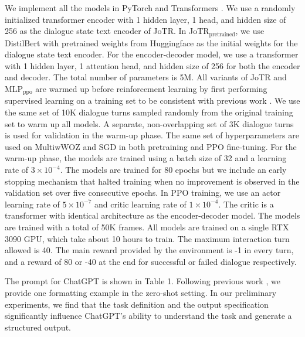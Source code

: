 \documentclass[letterpaper]{article} %
\begin{document}
We implement all the models in PyTorch \cite{paszke2019pytorch} and Transformers \cite{wolf-etal-2020-transformers}. 
We use a randomly initialized transformer encoder with 1 hidden layer, 1 head, and hidden size of 256 as the dialogue state text encoder of JoTR. 
In JoTR$_\text{pretrained}$, we use DistilBert \cite{sanh2019distilbert} with pretrained weights from Huggingface as the initial weights for the dialogue state text encoder.
For the encoder-decoder model, we use a transformer with 1 hidden layer, 1 attention head, and hidden size of 256 for both the encoder and decoder. The total number of parameters is 5M. All variants of JoTR and MLP$_\text{ppo}$ are warmed up before reinforcement learning by first performing supervised learning on a training set to be consistent with previous work \cite{wang-wong-2021-collaborative}. We use the same set of 10K dialogue turns sampled randomly from the original training set to warm up all models. A separate, non-overlapping set of 3K dialogue turns is used for validation in the warm-up phase.  The same set of hyperparameters are used on MultiwWOZ and SGD in both pretraining and PPO fine-tuning. For the warm-up phase, the models are trained using a batch size of 32 and a learning rate of $3 \times 10^{-4}$. The models are trained for 80 epochs but we include an early stopping mechanism that halted training when no improvement is observed in the validation set over five consecutive epochs. In PPO training, we use an actor learning rate of $5 \times 10^{-7}$ and critic learning rate of $1 \times 10^{-4}$. The critic is a transformer with identical architecture as the encoder-decoder model.
The models are trained with a total of 50K frames. 
All models are trained on a single RTX 3090 GPU, which take about 10 hours to train.
The maximum interaction turn allowed is 40. The main reward provided by the environment is -1 in every turn, and a reward of 80 or -40 at the end for successful or failed dialogue respectively. 

The prompt for ChatGPT is shown in Table 1. Following previous work \cite{wang-etal-2022-super}, we provide one formatting example in the zero-shot setting. In our preliminary experiments, we find that the task definition and the output specification significantly influence ChatGPT's ability to understand the task and generate a structured output. 
\end{document}
